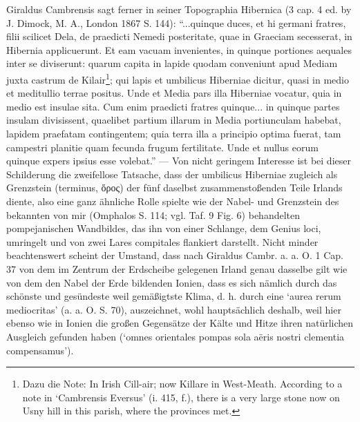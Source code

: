 \documentclass[a4paper, 11pt, oneside]{article}
\begin{document}
Giraldus Cambrensis sagt ferner in seiner Topographia Hibernica (3 cap. 4 ed. by J. Dimock, M. A., London 1867 S. 144): "`...quinque duces, et hi germani fratres, filii scilicet Dela, de praedicti Nemedi posteritate, quae in Graeciam secesserat, in Hibernia applicuerunt. Et eam vacuam invenientes, in quinque portiones aequales inter se diviserunt: quarum capita in lapide quodam conveniunt apud Mediam juxta castrum de Kilair\footnote{Dazu die Note: In Irish Cill-air; now Killare in West-Meath. According to a note in `Cambrensis Eversus' (i. 415, f.), there is a very large stone now on Usny hill in this parish, where the provinces met.}; qui lapis et umbilicus Hiberniae dicitur, quasi in medio et meditullio terrae positus. Unde et Media pars illa Hiberniae vocatur, quia in medio est insulae sita. Cum enim praedicti fratres quinque... in quinque partes insulam divisissent, quaelibet partium illarum in Media portiunculam habebat, lapidem praefatam contingentem; quia terra illa a principio optima fuerat, tam campestri planitie quam fecunda frugum fertilitate. Unde et nullus eorum quinque expers ipsius esse volebat."' --- Von nicht geringem Interesse ist bei dieser Schilderung die zweifellose Tatsache, dass der umbilicus Hiberniae zugleich als Grenzstein (terminus, ὅρος) der fünf daselbst zusammenstoßenden Teile Irlands diente, also eine ganz ähnliche Rolle spielte wie der Nabel- und Grenzstein des bekannten von mir (Omphalos S. 114; vgl. Taf. 9 Fig. 6) behandelten pompejanischen Wandbildes, das ihn von einer Schlange, dem Genius loci, umringelt und von zwei Lares compitales flankiert darstellt. Nicht minder beachtenswert scheint der Umstand, dass nach Giraldus Cambr. a. a. O. 1 Cap. 37 von dem im Zentrum der Erdscheibe gelegenen Irland genau dasselbe gilt wie von dem den Nabel der Erde bildenden Ionien, dass es sich nämlich durch das schönste und gesündeste weil gemäßigtste Klima, d. h. durch eine `aurea rerum mediocritas' (a. a. O. S. 70), auszeichnet, wohl hauptsächlich deshalb, weil hier ebenso wie in Ionien die großen Gegensätze der Kälte und Hitze ihren natürlichen Ausgleich gefunden haben (`omnes orientales pompas sola aëris nostri clementia compensamus').
\end{document}

